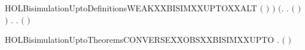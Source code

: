 \begin{SaveVerbatim}{HOLBisimulationUptoDefinitionsWEAKXXBISIMXXUPTOXXALT}
                        \ensuremath{(}    \ensuremath{)}  \ensuremath{)} \HOLSymConst{\HOLTokenConj{}}
           \ensuremath{(}\HOLSymConst{\HOLTokenForall{}}.
                 \HOLTokenWeakTransBegin\HOLConst{\ensuremath{\tau}}\HOLTokenWeakTransEnd {} \HOLSymConst{\HOLTokenImp{}}
                \HOLSymConst{\HOLTokenExists{}}.
                       \HOLSymConst{\HOLTokenConj{}}
                    \ensuremath{(}    \ensuremath{)}  \ensuremath{)} \HOLSymConst{\HOLTokenConj{}}
           \HOLSymConst{\HOLTokenForall{}}.
                \HOLTokenWeakTransBegin\HOLConst{\ensuremath{\tau}}\HOLTokenWeakTransEnd {} \HOLSymConst{\HOLTokenImp{}}
               \HOLSymConst{\HOLTokenExists{}}.
                      \HOLSymConst{\HOLTokenConj{}}
                   \ensuremath{(}    \ensuremath{)}  
\end{SaveVerbatim}
\newcommand{\HOLBisimulationUptoDefinitionsWEAKXXBISIMXXUPTOXXALT}{\UseVerbatim{HOLBisimulationUptoDefinitionsWEAKXXBISIMXXUPTOXXALT}}
\newcommand{\HOLBisimulationUptoDefinitions}{
\HOLDfnTag{BisimulationUpto}{OBS_BISIM_UPTO}\HOLBisimulationUptoDefinitionsOBSXXBISIMXXUPTO
\HOLDfnTag{BisimulationUpto}{STRONG_BISIM_UPTO}\HOLBisimulationUptoDefinitionsSTRONGXXBISIMXXUPTO
\HOLDfnTag{BisimulationUpto}{WEAK_BISIM_UPTO}\HOLBisimulationUptoDefinitionsWEAKXXBISIMXXUPTO
\HOLDfnTag{BisimulationUpto}{WEAK_BISIM_UPTO_ALT}\HOLBisimulationUptoDefinitionsWEAKXXBISIMXXUPTOXXALT
}
\begin{SaveVerbatim}{HOLBisimulationUptoTheoremsCONVERSEXXOBSXXBISIMXXUPTO}
\HOLTokenTurnstile{} \HOLSymConst{\HOLTokenForall{}}.   \HOLSymConst{\HOLTokenImp{}}  \ensuremath{(} \ensuremath{)}
\end{SaveVerbatim}
